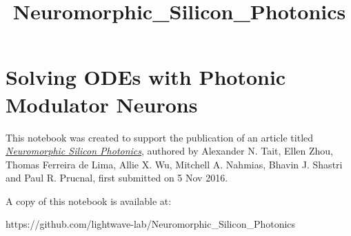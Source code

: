 \documentclass{report}
\title{Neuromorphic\_Silicon\_Photonics}
\begin{document}
    
    
    
    \maketitle
    
    
    \tableofcontents


    
\chapter{Solving ODEs with Photonic Modulator
Neurons}\label{solving-odes-with-photonic-modulator-neurons}

This notebook was created to support the publication of an article
titled \href{https://arxiv.org/abs/1611.02272}{\emph{Neuromorphic
Silicon Photonics}}, authored by Alexander N. Tait, Ellen Zhou, Thomas
Ferreira de Lima, Allie X. Wu, Mitchell A. Nahmias, Bhavin J. Shastri
and Paul R. Prucnal, first submitted on 5 Nov 2016.

A copy of this notebook is available at:

https://github.com/lightwave-lab/Neuromorphic\_Silicon\_Photonics
\end{document}
